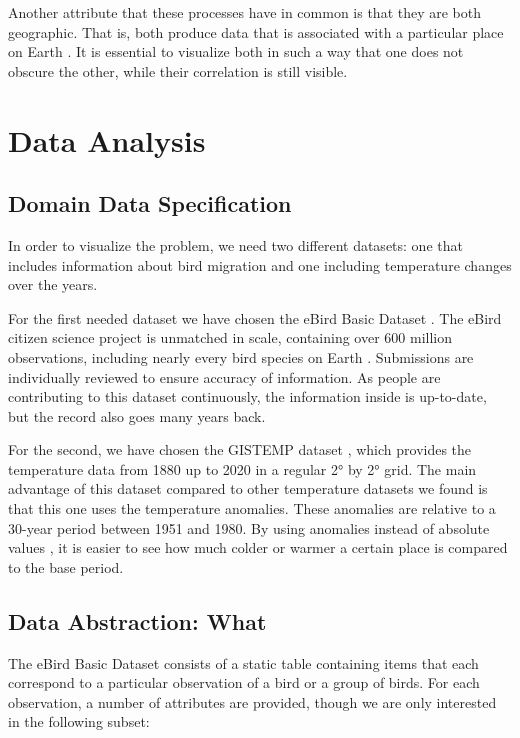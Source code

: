 \documentclass[journal]{vgtc}                %
\begin{document}
Another attribute that these processes have in common is that they are both geographic. That is, both produce data that is associated with a particular place on Earth \cite{iso2014geo}. It is essential to visualize both in such a way that one does not obscure the other, while their correlation is still visible.

\section{Data Analysis}

\subsection{Domain Data Specification}

In order to visualize the problem, we need two different datasets: one that includes information about bird migration and one including temperature changes over the years.

For the first needed dataset we have chosen the eBird Basic Dataset \cite{ebird2020data}. The eBird citizen science project is unmatched in scale, containing over 600 million observations, including nearly every bird species on Earth \cite{strimas2020ebird}. Submissions are individually reviewed to ensure accuracy of information. As people are contributing to this dataset continuously, the information inside is up-to-date, but the record also goes many years back.

For the second, we have chosen the GISTEMP dataset \cite{gistemp}, which provides the temperature data from 1880 up to 2020 in a regular 2° by 2° grid. The main advantage of this dataset compared to other temperature datasets we found is that this one uses the temperature anomalies. These anomalies are relative to a 30-year period between 1951 and 1980. By using anomalies instead of absolute values \cite{gistempanomalies}, it is easier to see how much colder or warmer a certain place is compared to the base period.

\subsection{Data Abstraction: What}
\label{subsec:data-abs-what}

The eBird Basic Dataset \cite{ebird2020data} consists of a static table containing items that each correspond to a particular observation of a bird or a group of birds. For each observation, a number of attributes are provided, though we are only interested in the following subset:
\end{document}

